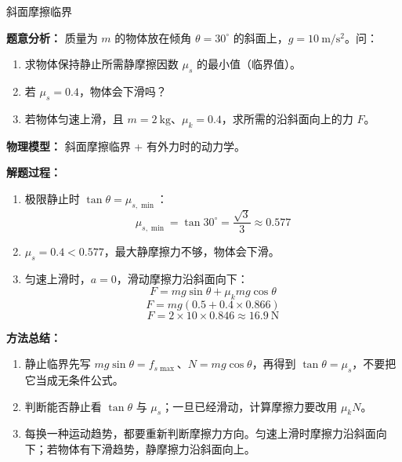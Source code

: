 \begin{examplebox}{斜面摩擦临界}

\textbf{题意分析：} 质量为 $m$ 的物体放在倾角 $\theta = 30^\circ$ 的斜面上，$g = 10\ \mathrm{m/s^2}$。问：
\begin{enumerate}
  \item 求物体保持静止所需静摩擦因数 $\mu_s$ 的最小值（临界值）。
  \item 若 $\mu_s = 0.4$，物体会下滑吗？
  \item 若物体匀速上滑，且 $m = 2\ \mathrm{kg}$、$\mu_k = 0.4$，求所需的沿斜面向上的力 $F$。
\end{enumerate}

\textbf{物理模型：} 斜面摩擦临界 + 有外力时的动力学。

\textbf{解题过程：}

\begin{enumerate}
  \item 极限静止时 $\tan\theta = \mu_{s,\min}$：
  \[
  \mu_{s,\min} = \tan 30^\circ = \frac{\sqrt{3}}{3} \approx 0.577
  \]

  \item $\mu_s = 0.4 < 0.577$，最大静摩擦力不够，物体会下滑。

  \item 匀速上滑时，$a = 0$，滑动摩擦力沿斜面向下：
  \[
  F = mg\sin\theta + \mu_k mg\cos\theta
  \]
  \[
  F = mg(0.5 + 0.4 \times 0.866)
  \]
  \[
  F = 2 \times 10 \times 0.846 \approx 16.9\ \mathrm{N}
  \]
\end{enumerate}

\textbf{方法总结：}
\begin{enumerate}
  \item 静止临界先写 $mg\sin\theta=f_{s\max}$、$N=mg\cos\theta$，再得到 $\tan\theta=\mu_s$，不要把它当成无条件公式。
  \item 判断能否静止看 $\tan\theta$ 与 $\mu_s$；一旦已经滑动，计算摩擦力要改用 $\mu_k N$。
  \item 每换一种运动趋势，都要重新判断摩擦力方向。匀速上滑时摩擦力沿斜面向下；若物体有下滑趋势，静摩擦力沿斜面向上。
\end{enumerate}

\end{examplebox}

